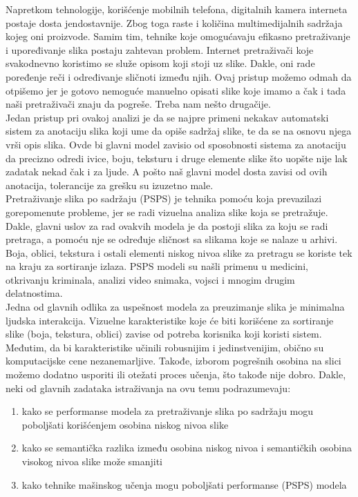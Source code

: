 \documentclass{article}
\begin{document}
Napretkom tehnologije, korišćenje mobilnih telefona, digitalnih kamera interneta postaje dosta jendostavnije. Zbog toga raste i količina multimedijalnih sadržaja kojeg oni proizvode. Samim tim, tehnike koje omogućavaju efikasno pretraživanje i upoređivanje slika postaju zahtevan problem. Internet pretraživači koje svakodnevno koristimo se služe opisom koji stoji uz slike. Dakle, oni rade poređenje reči i određivanje sličnoti između njih. Ovaj pristup možemo odmah da otpišemo jer je gotovo nemoguće manuelno opisati slike koje imamo a čak i tada naši pretraživači znaju da pogreše. Treba nam nešto drugačije. \\
Jedan pristup pri ovakoj analizi je da se najpre primeni nekakav automatski sistem za anotaciju slika koji ume da opiše sadržaj slike, te da se na osnovu njega vrši opis slika. Ovde bi glavni model zavisio od sposobnosti sistema za anotaciju da precizno odredi ivice, boju, teksturu i druge elemente slike što uopšte nije lak zadatak nekad čak i za ljude. A pošto naš glavni model dosta zavisi od ovih anotacija, tolerancije za grešku su izuzetno male.\\
Pretraživanje slika po sadržaju (PSPS) je tehnika pomoću koja prevazilazi gorepomenute probleme, jer se radi vizuelna analiza slike koja se pretražuje. Dakle, glavni uslov za rad ovakvih modela je da postoji slika za koju se radi pretraga, a pomoću nje se određuje sličnost sa slikama koje se nalaze u arhivi. Boja, oblici, tekstura i ostali elementi niskog nivoa slike za pretragu se koriste tek na kraju za sortiranje izlaza. PSPS modeli su našli primenu u medicini, otkrivanju kriminala, analizi video snimaka, vojsci i mnogim drugim delatnostima. \\
Jedna od glavnih odlika za uspešnost modela za preuzimanje slika je minimalna ljudska interakcija. Vizuelne karakteristike koje će biti korišćene za sortiranje slike (boja, tekstura, oblici) zavise od potreba korisnika koji koristi sistem. Međutim, da bi karakteristike učinili robusnijim i jedinstvenijim, obično su komputacijske cene nezanemarljive. Takođe, izborom pogrešnih osobina na slici  možemo dodatno usporiti ili otežati proces učenja, što takođe nije dobro. Dakle, neki od glavnih zadataka istraživanja na ovu temu podrazumevaju: 
\begin{enumerate}
\item kako se performanse modela za pretraživanje slika po sadržaju mogu poboljšati korišćenjem osobina niskog nivoa slike 
\item kako se semantička razlika između osobina niskog nivoa i semantičkih osobina visokog nivoa slike može smanjiti
\item kako tehnike mašinskog učenja mogu poboljšati performanse (PSPS) modela
\end{enumerate}
\end{document}
